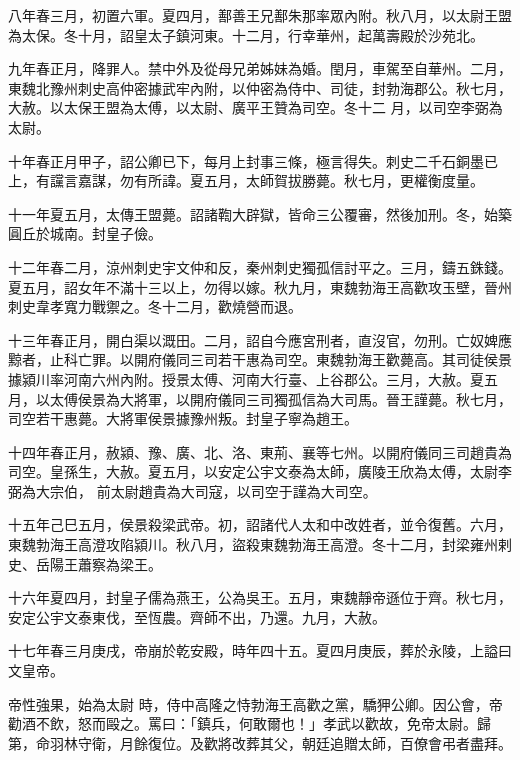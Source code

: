 \begin{pinyinscope}
 八年春三月，初置六軍。夏四月，鄯善王兄鄯朱那率眾內附。秋八月，以太尉王盟為太保。冬十月，詔皇太子鎮河東。十二月，行幸華州，起萬壽殿於沙苑北。



 九年春正月，降罪人。禁中外及從母兄弟姊妹為婚。閏月，車駕至自華州。二月，東魏北豫州刺史高仲密據武牢內附，以仲密為侍中、司徒，封勃海郡公。秋七月，大赦。以太保王盟為太傅，以太尉、廣平王贊為司空。冬十二
 月，以司空李弼為太尉。



 十年春正月甲子，詔公卿已下，每月上封事三條，極言得失。刺史二千石銅墨已上，有讜言嘉謀，勿有所諱。夏五月，太師賀拔勝薨。秋七月，更權衡度量。



 十一年夏五月，太傳王盟薨。詔諸鞫大辟獄，皆命三公覆審，然後加刑。冬，始築圓丘於城南。封皇子儉。



 十二年春二月，涼州刺史宇文仲和反，秦州刺史獨孤信討平之。三月，鑄五銖錢。夏五月，詔女年不滿十三以上，勿得以嫁。秋九月，東魏勃海王高歡攻玉壁，晉州刺史韋孝寬力戰禦之。冬十二月，歡燒營而退。



 十三年春正月，開白渠以溉田。二月，詔自今應宮刑者，直沒官，勿刑。亡奴婢應黥者，止科亡罪。以開府儀同三司若干惠為司空。東魏勃海王歡薨高。其司徒侯景據潁川率河南六州內附。授景太傅、河南大行臺、上谷郡公。三月，大赦。夏五月，以太傅侯景為大將軍，以開府儀同三司獨孤信為大司馬。晉王謹薨。秋七月，司空若干惠薨。大將軍侯景據豫州叛。封皇子寧為趙王。



 十四年春正月，赦潁、豫、廣、北、洛、東荊、襄等七州。以開府儀同三司趙貴為司空。皇孫生，大赦。夏五月，以安定公宇文泰為太師，廣陵王欣為太傅，太尉李弼為大宗伯，
 前太尉趙貴為大司寇，以司空于謹為大司空。



 十五年己巳五月，侯景殺梁武帝。初，詔諸代人太和中改姓者，並令復舊。六月，東魏勃海王高澄攻陷潁川。秋八月，盜殺東魏勃海王高澄。冬十二月，封梁雍州剌史、岳陽王蕭察為梁王。



 十六年夏四月，封皇子儒為燕王，公為吳王。五月，東魏靜帝遜位于齊。秋七月，安定公宇文泰東伐，至恆農。齊師不出，乃還。九月，大赦。



 十七年春三月庚戌，帝崩於乾安殿，時年四十五。夏四月庚辰，葬於永陵，上謚曰文皇帝。



 帝性強果，始為太尉
 時，侍中高隆之恃勃海王高歡之黨，驕狎公卿。因公會，帝勸酒不飲，怒而毆之。罵曰：「鎮兵，何敢爾也！」孝武以歡故，免帝太尉。歸第，命羽林守衛，月餘復位。及歡將改葬其父，朝廷追贈太師，百僚會弔者盡拜。




\end{pinyinscope}
